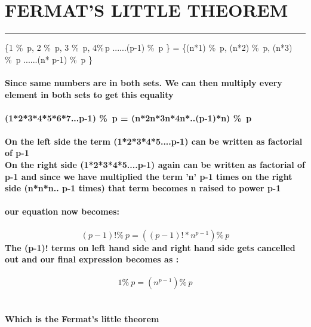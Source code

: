 \documentclass{article}
\begin{document}
\section * {FERMAT'S LITTLE THEOREM}
\hrule 
\bigskip 
\{1 \%\ p, 2 \%\ p, 3 \%\ p, 4\%\,p ......(p-1) \%\ p \} = \{(n*1) \%\ p, (n*2) \%\ p, (n*3) \%\ p ......(n* p-1) \%\ p \}
\\
\\
\textbf{Since  same numbers are in
both sets. We can then multiply every element in both sets to get this equality
\\
\\
(1*2*3*4*5*6*7...p-1) \%\ p = (n*2n*3n*4n*..(p-1)*n) \%\ p
\\
\\
On the left side the term (1*2*3*4*5....p-1) can be written as factorial of p-1 \\
On the right side  (1*2*3*4*5....p-1) again  can be written as factorial of p-1 and since we have  multiplied the term 'n'  p-1 times on the right side  (n*n*n.. p-1 times) that term becomes n raised to power p-1 \\ \\ 
our equation now becomes:} 
\\ 
\\ 
\textbf{\[ (p-1)! \%\ p = ((p-1)! * n^{p-1}) \%\ p   \] }
\textbf {The (p-1)! terms on left hand side and right hand side gets cancelled out and our final expression becomes as :}
\\
\\
\textbf{\[ 1 \%\ p = (n ^{p-1}) \%\ p \]}
\\
\\
\textbf{Which is the Fermat's little theorem}
\end{document}

